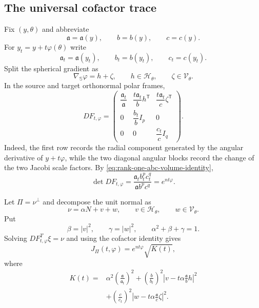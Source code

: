 \documentclass[11pt,reqno]{amsart}
\numberwithin{equation}{section}
\theoremstyle{definition}
\theoremstyle{remark}
\begin{document}
\subsection{The universal cofactor trace}

Fix $(y,\theta)$ and abbreviate
\[
\mathfrak a=\mathfrak a(y),
\qquad
b=b(y),
\qquad
c=c(y).
\]
For $y_t=y+t\varphi(\theta)$ write
\[
\mathfrak a_t=\mathfrak a(y_t),
\qquad
b_t=b(y_t),
\qquad
c_t=c(y_t).
\]
Split the spherical gradient as
\[
\nabla_{\mathbb S}\varphi
=
h+\zeta,
\qquad
h\in\mathcal H_\theta,
\qquad
\zeta\in\mathcal V_\theta.
\]
In the source and target orthonormal polar frames,
\[
DF_{t,\varphi}
=
\begin{pmatrix}
\dfrac{\mathfrak a_t}{\mathfrak a}
&
\dfrac{t\mathfrak a_t}{b}h^{\mathsf T}
&
\dfrac{t\mathfrak a_t}{c}\zeta^{\mathsf T}
\\[0.8em]
0&\dfrac{b_t}{b}I_p&0
\\[0.8em]
0&0&\dfrac{c_t}{c}I_q
\end{pmatrix}.
\]
Indeed, the first row records the radial component generated by the angular
derivative of $y+t\varphi$, while the two diagonal angular blocks record the
change of the two Jacobi scale factors.  By
\eqref{eq:rank-one-abc-volume-identity},
\[
\det DF_{t,\varphi}
=
\frac{\mathfrak a_tb_t^pc_t^q}{\mathfrak a b^pc^q}
=
e^{nt\varphi}.
\]

Let $\Pi=\nu^\perp$ and decompose the unit normal as
\begin{equation}
\nu
=
\alpha N+v+w,
\qquad
v\in\mathcal H_\theta,
\qquad
w\in\mathcal V_\theta.
\label{eq:rank-one-normal-decomposition}
\end{equation}
Put
\[
\beta=|v|^2,
\qquad
\gamma=|w|^2,
\qquad
\alpha^2+\beta+\gamma=1.
\]
Solving $DF_{t,\varphi}^{T}\xi=\nu$ and using the cofactor identity gives
\[
J_\Pi(t,\varphi)
=
e^{nt\varphi}\sqrt{K(t)},
\]
where
\begin{equation}
\begin{aligned}
K(t)
={}&
\alpha^2
\left(\frac{\mathfrak a}{\mathfrak a_t}\right)^2
+
\left(\frac{b}{b_t}\right)^2
\left|v-t\alpha\frac{\mathfrak a}{b}h\right|^2
\\
&+
\left(\frac{c}{c_t}\right)^2
\left|w-t\alpha\frac{\mathfrak a}{c}\zeta\right|^2.
\end{aligned}
\label{eq:rank-one-K}
\end{equation}
\end{document}
